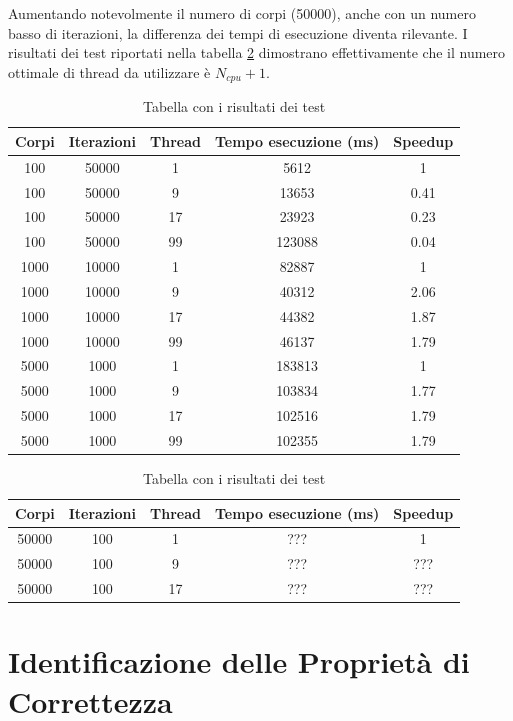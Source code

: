 \documentclass[12pt,a4paper,openright,twoside]{book}
\begin{document}
Aumentando notevolmente il numero di corpi (50000), anche con un numero basso di iterazioni,
la differenza dei tempi di esecuzione diventa rilevante.
I risultati dei test riportati nella tabella \ref{tab:table2} dimostrano effettivamente che
il numero ottimale di thread da utilizzare è $N_{cpu} + 1$.

\begin{center}
	\begin{table}
		\begin{tabular}{ |c|c|c|c|c| } 
			\hline
				Corpi & Iterazioni & Thread & Tempo esecuzione (ms) & Speedup \\
			\hline
				100  & 50000  & 1 & 5612 & 1 \\
			\hline
				100  & 50000  & 9 & 13653 & 0.41 \\
			\hline
				100  & 50000  & 17 & 23923 & 0.23 \\
			\hline
				100  & 50000  & 99 & 123088 & 0.04 \\
			\hline
				1000  & 10000  & 1 & 82887 & 1 \\
			\hline
				1000  & 10000  & 9 & 40312 & 2.06 \\
			\hline
				1000  & 10000  & 17 & 44382 & 1.87 \\
			\hline
				1000  & 10000  & 99 & 46137 & 1.79 \\
			\hline
				5000  & 1000  & 1 & 183813 & 1 \\
			\hline
				5000  & 1000  & 9 & 103834 & 1.77 \\
			\hline
				5000  & 1000  & 17 & 102516 & 1.79 \\
			\hline
				5000  & 1000  & 99 & 102355 & 1.79 \\
			\hline
		\end{tabular}
		\label{tab:table1}
		\caption{Tabella con i risultati dei test}
	\end{table}
\end{center}

\begin{center}
	\begin{table}
		\begin{tabular}{ |c|c|c|c|c| } 
			\hline
				Corpi & Iterazioni & Thread & Tempo esecuzione (ms) & Speedup \\
			\hline
				50000  & 100  & 1 & ??? & 1 \\
			\hline
				50000  & 100  & 9 & ??? & ??? \\
			\hline
				50000  & 100  & 17 & ??? & ??? \\
			\hline
		\end{tabular}
		\label{tab:table2}
		\caption{Tabella con i risultati dei test}
	\end{table}
\end{center}

\chapter{Identificazione delle Proprietà di Correttezza} %
\label{chap:Identificazione delle Proprietà di Correttezza}
\end{document}
